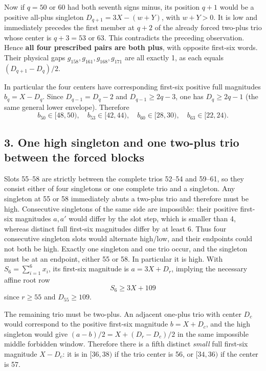 \documentclass[
  11pt,
]{article}
\begin{document}
Now if \(q=50\) or 60 had both seventh signs minus, its position \(q+1\)
would be a positive all-plus singleton \(D_{q+1}=3X-(w+Y)\), with
\(w+Y>0\). It is low and immediately precedes the first member at
\(q+2\) of the already forced two-plus trio whose center is \(q+3=53\)
or 63. This contradicts the preceding observation. Hence \textbf{all
four prescribed pairs are both plus}, with opposite first-six words.
Their physical gaps \(g_{158},g_{161},g_{168},g_{171}\) are all exactly
1, as each equals \((D_{q+1}-D_q)/2\).

In particular the four centers have corresponding first-six positive
full magnitudes \(b_q=X-D_q\). Since \(D_{q-1}=D_q-2\) and
\(D_{q-1}\ge2q-3\), one has \(D_q\ge2q-1\) (the same general lower
envelope). Therefore \[
b_{50}\in[48,50),\quad b_{53}\in[42,44),\quad
b_{60}\in[28,30),\quad b_{63}\in[22,24).
\]

\subsection{3. One high singleton and one two-plus trio between the
forced
blocks}\label{one-high-singleton-and-one-two-plus-trio-between-the-forced-blocks}

Slots 55--58 are strictly between the complete trios 52--54 and 59--61,
so they consist either of four singletons or one complete trio and a
singleton. Any singleton at 55 or 58 immediately abuts a two-plus trio
and therefore must be high. Consecutive singletons of the same side are
impossible: their positive first-six magnitudes \(a,a'\) would differ by
the slot step, which is smaller than 4, whereas distinct full first-six
magnitudes differ by at least 6. Thus four consecutive singleton slots
would alternate high/low, and their endpoints could not both be high.
Exactly one singleton and one trio occur, and the singleton must be at
an endpoint, either 55 or 58. In particular it is high. With
\(S_6=\sum_{i=1}^6x_i\), its first-six magnitude is \(a=3X+D_r\),
implying the necessary affine root row \[
\boxed{S_6\ge3X+109}
\] since \(r\ge55\) and \(D_{55}\ge109\).

The remaining trio must be two-plus. An adjacent one-plus trio with
center \(D_c\) would correspond to the positive first-six magnitude
\(b=X+D_c\), and the high singleton would give \((a-b)/2=X+(D_r-D_c)/2\)
in the same impossible middle forbidden window. Therefore there is a
fifth distinct \emph{small} full first-six magnitude \(X-D_c\): it is in
\([36,38)\) if the trio center is 56, or \([34,36)\) if the center is
57.
\end{document}
